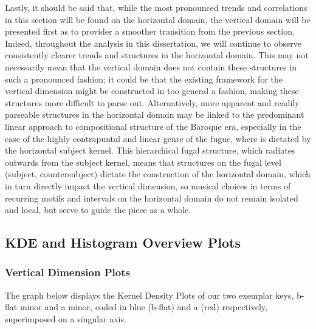 Lastly, it should be said that, while the most pronounced trends and
correlations in this section will be found on the horizontal domain, the
vertical domain will be presented first as to provider a smoother
transition from the previous section. Indeed, throughout the analysis in
this dissertation, we will continue to observe consistently clearer
trends and structures in the horizontal domain. This may not necessarily
mean that the vertical domain does not contain these structures in such
a pronounced fashion; it could be that the existing framework for the
vertical dimension might be constructed in too general a fashion, making
these structures more difficult to parse out. Alternatively, more
apparent and readily parseable structures in the horizontal domain may
be linked to the predominant linear approach to compositional structure
of the Baroque era, especially in the case of the highly contrapuntal
and linear genre of the fugue, where is dictated by the horizontal
subject kernel. This hierarchical fugal structure, which radiates
outwards from the subject kernel, means that structures on the fugal
level (subject, countersubject) dictate the construction of the
horizontal domain, which in turn directly impact the vertical dimension,
so musical choices in terms of recurring motifs and intervals on the
horizontal domain do not remain isolated and local, but serve to guide
the piece as a whole.

    \subsection{KDE and Histogram Overview
Plots}\label{kde-and-histogram-overview-plots}

\subsubsection{Vertical Dimension Plots}\label{vertical-dimension-plots}

The graph below displays the Kernel Density Plots of our two exemplar
keys, b-flat minor and a minor, coded in blue (b-flat) and a (red)
respectively, superimposed on a singular axis.




